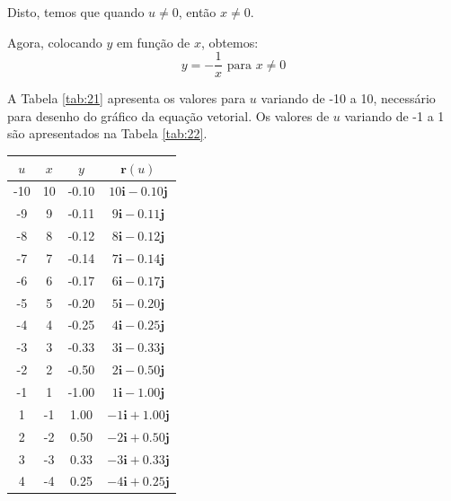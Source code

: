 \documentclass[a4paper,11pt,pagenumber=true]{article}
\theoremstyle{mytheor}
\begin{document}
            Disto, temos que quando $u \neq 0$, então $x \neq 0$.
            
            Agora, colocando $y$ em função de $x$, obtemos: 
            \begin{equation} \label{eq:2}
                y = -\frac{1}{x} \text{ para } x \neq 0
            \end{equation}
            
            A Tabela \ref{tab:21} apresenta os valores para $u$ variando de -10 a 10, necessário para desenho do gráfico da equação vetorial. Os valores de $u$ variando de -1 a 1 são apresentados na Tabela \ref{tab:22}.
            \begin{table}[h]
                \centering
                \begin{tabular}{c|c|c|c}
                    \toprule
                        $u$	&$x$	&$y$	&$\mathbf{r}(u)$\\ \midrule
                        -10	& 10	& -0.10	&$10\mathbf{i} -   0.10\mathbf{j}$\\
                         -9	&  9	& -0.11	&$9\mathbf{i} -   0.11\mathbf{j}$\\
                         -8	&  8	& -0.12	&$8\mathbf{i} -   0.12\mathbf{j}$\\
                         -7	&  7	& -0.14	&$7\mathbf{i} -   0.14\mathbf{j}$\\
                         -6	&  6	& -0.17	&$6\mathbf{i} -   0.17\mathbf{j}$\\
                         -5	&  5	& -0.20	&$5\mathbf{i} -   0.20\mathbf{j}$\\
                         -4	&  4	& -0.25	&$4\mathbf{i} -   0.25\mathbf{j}$\\
                         -3	&  3	& -0.33	&$3\mathbf{i} -   0.33\mathbf{j}$\\
                         -2	&  2	& -0.50	&$2\mathbf{i} -   0.50\mathbf{j}$\\
                         -1	&  1	& -1.00	&$1\mathbf{i} -   1.00\mathbf{j}$\\
                          1	& -1	&  1.00	&$-1\mathbf{i} +   1.00\mathbf{j}$\\
                          2	& -2	&  0.50	&$-2\mathbf{i} +   0.50\mathbf{j}$\\
                          3	& -3	&  0.33	&$-3\mathbf{i} +   0.33\mathbf{j}$\\
                          4	& -4	&  0.25	&$-4\mathbf{i} +   0.25\mathbf{j}$\\

\end{tabular}
\end{table}
\end{document}
